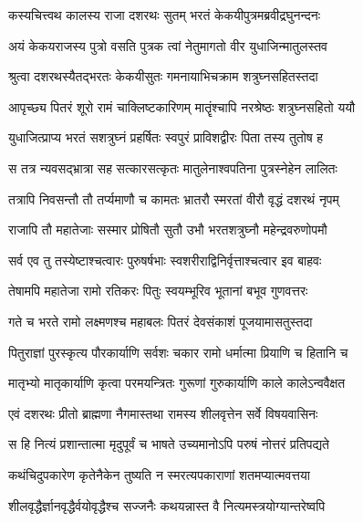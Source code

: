 

\twolineshloka
{कस्यचित्त्वथ कालस्य राजा दशरथः सुतम्}
{भरतं केकयीपुत्रमब्रवीद्रघुनन्दनः} %

\twolineshloka
{अयं केकयराजस्य पुत्रो वसति पुत्रक}
{त्वां नेतुमागतो वीर युधाजिन्मातुलस्तव} %

\twolineshloka
{श्रुत्वा दशरथस्यैतद्भरतः केकयीसुतः}
{गमनायाभिचक्राम शत्रुघ्नसहितस्तदा} %

\twolineshloka
{आपृच्छ्य पितरं शूरो रामं चाक्लिष्टकारिणम्}
{मातॄंश्चापि नरश्रेष्ठः शत्रुघ्नसहितो ययौ} %

\twolineshloka
{युधाजित्प्राप्य भरतं सशत्रुघ्नं प्रहर्षितः}
{स्वपुरं प्राविशद्वीरः पिता तस्य तुतोष ह} %

\twolineshloka
{स तत्र न्यवसद्भ्रात्रा सह सत्कारसत्कृतः}
{मातुलेनाश्वपतिना पुत्रस्नेहेन लालितः} %

\twolineshloka
{तत्रापि निवसन्तौ तौ तर्प्यमाणौ च कामतः}
{भ्रातरौ स्मरतां वीरौ वृद्धं दशरथं नृपम्} %

\twolineshloka
{राजापि तौ महातेजाः सस्मार प्रोषितौ सुतौ}
{उभौ भरतशत्रुघ्नौ महेन्द्रवरुणोपमौ} %

\twolineshloka
{सर्व एव तु तस्येष्टाश्चत्वारः पुरुषर्षभाः}
{स्वशरीराद्विनिर्वृत्ताश्चत्वार इव बाहवः} %

\twolineshloka
{तेषामपि महातेजा रामो रतिकरः पितुः}
{स्वयम्भूरिव भूतानां बभूव गुणवत्तरः} %

\twolineshloka
{गते च भरते रामो लक्ष्मणश्च महाबलः}
{पितरं देवसंकाशं पूजयामासतुस्तदा} %

\twolineshloka
{पितुराज्ञां पुरस्कृत्य पौरकार्याणि सर्वशः}
{चकार रामो धर्मात्मा प्रियाणि च हितानि च} %

\twolineshloka
{मातृभ्यो मातृकार्याणि कृत्वा परमयन्त्रितः}
{गुरूणां गुरुकार्याणि काले कालेऽन्ववैक्षत} %

\twolineshloka
{एवं दशरथः प्रीतो ब्राह्मणा नैगमास्तथा}
{रामस्य शीलवृत्तेन सर्वे विषयवासिनः} %

\twolineshloka
{स हि नित्यं प्रशान्तात्मा मृदुपूर्वं च भाषते}
{उच्यमानोऽपि परुषं नोत्तरं प्रतिपद्यते} %

\twolineshloka
{कथंचिदुपकारेण कृतेनैकेन तुष्यति}
{न स्मरत्यपकाराणां शतमप्यात्मवत्तया} %

\twolineshloka
{शीलवृद्धैर्ज्ञानवृद्धैर्वयोवृद्धैश्च सज्जनैः}
{कथयन्नास्त वै नित्यमस्त्रयोग्यान्तरेष्वपि} %

